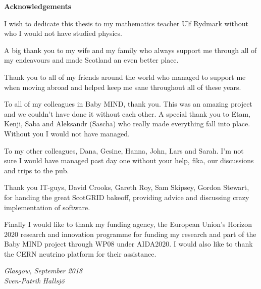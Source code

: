 \vspace*{1.75in}

\begin{center} {\bf Acknowledgements}\end{center}

I wish to dedicate this thesis to my mathematics teacher Ulf Rydmark without who I would not have studied physics.

A big thank you to my wife and my family who always support me through all of my endeavours and made Scotland an even better place.

Thank you to all of my friends around the world who managed to support me when moving abroad and helped keep me sane throughout all of these years. 

To all of my colleagues in Baby MIND, thank you. This was an amazing project and we couldn't have done it without each other. A special thank you to Etam, Kenji, Saba and Aleksandr (Sascha) who really made everything fall into place. Without you I would not have managed.

To my other colleagues, Dana, Gesine, Hanna, John, Lars and Sarah. I'm not sure I would have managed past day one without your help, fika, our discussions and trips to the pub.

Thank you IT-guys, David Crooks, Gareth Roy, Sam Skipsey, Gordon Stewart, for handing the great ScotGRID bakeoff, providing advice and discussing crazy implementation of software.

Finally I would like to thank my funding agency, the European Union's Horizon 2020 research and innovation programme for funding my research and part of the Baby MIND project through WP08 under AIDA2020. I would also like to thank the CERN neutrino platform for their assistance.

\begin{flushright} \textit{Glasgow, September 2018 \\ Sven-Patrik Hallsj{\"o}}\end{flushright}




